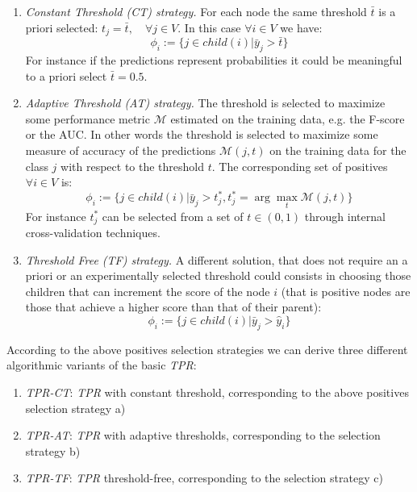 \documentclass{bioinfo}
\begin{document}
\begin{methods}
\begin{enumerate}
\item {\em Constant Threshold (CT) strategy.} 
For each node the same threshold $\bar{t}$ is a priori selected: $t_j = \bar{t}, \quad \forall j \in V$.
In this case $\forall i \in V$ we have:
\begin{equation} 
\phi_i := \{ j \in child(i) | \bar{y}_j > \bar{t} \}
\label{eq:phi-constant}
\end{equation}
For instance if the predictions represent probabilities it could be meaningful to a priori select $\bar{t} = 0.5$.
\item {\em Adaptive Threshold (AT) strategy.}
The threshold is selected to maximize some performance metric $\mathcal{M}$ estimated on the training data, e.g. the F-score or the AUC. In other words the threshold is selected to maximize some measure of accuracy of the predictions $\mathcal{M}(j,t)$  on the training data for the class $j$ with respect to the threshold $t$. The corresponding set of positives  $\forall i \in V$ is:
\begin{equation} 
\phi_i := \{ j \in child(i) | \bar{y}_j > t_j^*,  t_j^* = \arg \max_{t} \mathcal{M}(j,t) \}
\label{eq:phi-adaptive}
\end{equation} 
For instance $t_j^*$ can be selected from a set of $t \in (0,1)$ through internal cross-validation techniques.
\item {\em Threshold Free (TF) strategy.}
A different solution, that does not require an a priori or an experimentally selected threshold could consists in choosing those children that can increment the score of the node $i$ (that is  positive nodes are those that achieve a higher score than that of their parent):
\begin{equation} 
\phi_i := \{ j \in child(i) | \bar{y}_j > \hat{y}_i \}
\label{eq:phi-free}
\end{equation}
\end{enumerate}
According to the above positives selection strategies we can derive three different algorithmic variants of the basic {\em TPR}:
\begin{enumerate}
\item {\em TPR-CT}: {\em TPR} with constant threshold, corresponding to the above positives selection strategy a)
\item {\em TPR-AT}: {\em TPR} with adaptive thresholds, corresponding to the selection strategy b)
\item {\em TPR-TF}: {\em TPR} threshold-free, corresponding to the selection strategy c)
\end{enumerate}


\end{methods}
\end{document}
